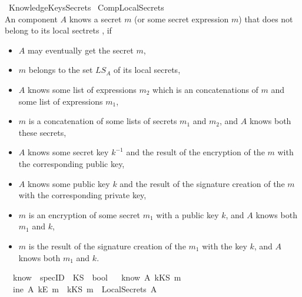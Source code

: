 %
\begin{isabellebody}%
\def\isabellecontext{KnowledgeKeysSecrets}%
%
\isamarkuptrue%
%
\isadelimtheory
%
\endisadelimtheory
%
\isatagtheory
{}\isamarkupfalse%
\ KnowledgeKeysSecrets\isanewline
{}\ CompLocalSecrets\ \isanewline
{}%
\endisatagtheory
{\isafoldtheory}%
%
\isadelimtheory
%
\endisadelimtheory
%
~\\
An component $A$ knows a secret $m$ (or some secret expression $m$)  that does not belong to its local sectrets , if
\begin{itemize}
	\item %
	$A$  may eventually get the secret $m$,
	\item 
	$m$ belongs to the set $LS_A$ of its local secrets, 
	\item %
	$A$ knows some list of expressions $m_2$ which is an concatenations of $m$ and some list of expressions $m_1$,
	\item %
	$m$ is a concatenation of some lists of secrets $m_1$ and $m_2$, and $A$ knows both these secrets,
	\item %
	$A$ knows some secret key $k^{-1}$ and the result of the encryption of the $m$ with the corresponding public key,
	\item %
	$A$ knows some public key $k$ and the result of the signature creation of the $m$ with the corresponding private key,%
	\item %
	$m$ is an encryption of some secret $m_1$ with a public key $k$, and $A$ knows both $m_1$ and $k$,
	\item %
	$m$ is the result of the signature creation of the $m_1$ with the key $k$, and $A$ knows both $m_1$ and $k$.
\end{itemize}
\isamarkupfalse%
\isanewline
\ \ know\ {\isacharcolon}{\isacharcolon}\ {\isachardoublequoteopen}specID\ {\isasymRightarrow}\ KS\ {\isasymRightarrow}\ bool{\isachardoublequoteclose}\isanewline
{}\ \isanewline
\ {\isachardoublequoteopen}know\ A\ {\isacharparenleft}kKS\ m{\isacharparenright}\ {\isacharequal}\ \isanewline
\ \ {\isacharparenleft}{\isacharparenleft}ine\ A\ {\isacharparenleft}kE\ m{\isacharparenright}{\isacharparenright}\ {\isasymor}\ {\isacharparenleft}{\isacharparenleft}kKS\ m{\isacharparenright}\ {\isasymin}\ {\isacharparenleft}LocalSecrets\ A{\isacharparenright}{\isacharparenright}{\isacharparenright}{\isachardoublequoteclose}\ {\isacharbar}\ \isanewline

\end{isabellebody}
